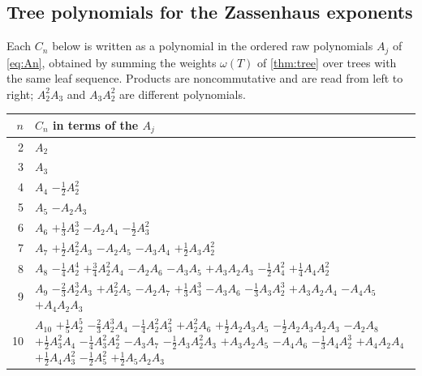 \subsection{Tree polynomials for the Zassenhaus exponents}
Each $C_n$ below is written as a polynomial in the ordered raw polynomials
$A_j$ of \eqref{eq:An}, obtained by summing the weights $\omega(T)$ of
\cref{thm:tree} over trees with the same leaf sequence. Products are
noncommutative and are read from left to right; $A_2^2A_3$ and $A_3A_2^2$ are
different polynomials.
\begin{center}\small
\renewcommand{\arraystretch}{1.3}
\begin{tabular}{@{}r>{\raggedright\arraybackslash}p{}@{}}
\toprule
$n$ & $C_n$ in terms of the $A_j$\\
\midrule
2 & $A_{2}$\\
3 & $A_{3}$\\
4 & $A_{4}$ $-\tfrac{1}{2}A_{2}^{2}$\\
5 & $A_{5}$ $-A_{2}A_{3}$\\
6 & $A_{6}$ $+\tfrac{1}{3}A_{2}^{3}$ $-A_{2}A_{4}$ $-\tfrac{1}{2}A_{3}^{2}$\\
7 & $A_{7}$ $+\tfrac{1}{2}A_{2}^{2}A_{3}$ $-A_{2}A_{5}$ $-A_{3}A_{4}$ $+\tfrac{1}{2}A_{3}A_{2}^{2}$\\
8 & $A_{8}$ $-\tfrac{1}{4}A_{2}^{4}$ $+\tfrac{3}{4}A_{2}^{2}A_{4}$ $-A_{2}A_{6}$ $-A_{3}A_{5}$ $+A_{3}A_{2}A_{3}$ $-\tfrac{1}{2}A_{4}^{2}$ $+\tfrac{1}{4}A_{4}A_{2}^{2}$\\
9 & $A_{9}$ $-\tfrac{2}{3}A_{2}^{3}A_{3}$ $+A_{2}^{2}A_{5}$ $-A_{2}A_{7}$ $+\tfrac{1}{3}A_{3}^{3}$ $-A_{3}A_{6}$ $-\tfrac{1}{3}A_{3}A_{2}^{3}$ $+A_{3}A_{2}A_{4}$ $-A_{4}A_{5}$ $+A_{4}A_{2}A_{3}$\\
10 & $A_{10}$ $+\tfrac{1}{5}A_{2}^{5}$ $-\tfrac{2}{3}A_{2}^{3}A_{4}$ $-\tfrac{1}{4}A_{2}^{2}A_{3}^{2}$ $+A_{2}^{2}A_{6}$ $+\tfrac{1}{2}A_{2}A_{3}A_{5}$ $-\tfrac{1}{2}A_{2}A_{3}A_{2}A_{3}$ $-A_{2}A_{8}$ $+\tfrac{1}{2}A_{3}^{2}A_{4}$ $-\tfrac{1}{4}A_{3}^{2}A_{2}^{2}$ $-A_{3}A_{7}$ $-\tfrac{1}{2}A_{3}A_{2}^{2}A_{3}$ $+A_{3}A_{2}A_{5}$ $-A_{4}A_{6}$ $-\tfrac{1}{3}A_{4}A_{2}^{3}$ $+A_{4}A_{2}A_{4}$ $+\tfrac{1}{2}A_{4}A_{3}^{2}$ $-\tfrac{1}{2}A_{5}^{2}$ $+\tfrac{1}{2}A_{5}A_{2}A_{3}$\\
\bottomrule
\end{tabular}
\end{center}

